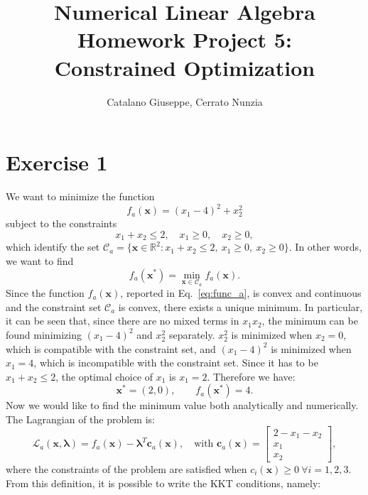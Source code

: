 \documentclass[a4paper,11pt]{article}
\newcommand{\R}{\mathbb{R}}
\begin{document}
	\author{Catalano Giuseppe, Cerrato Nunzia}
	\title{Numerical Linear Algebra Homework Project 5:\\Constrained Optimization}
	\date{}
	\maketitle

\section*{Exercise 1}
We want to minimize the function
\begin{equation}
	f_a(\textbf{x}) = (x_{1}-4)^2 + x_{2}^{2}
	\label{eq:func_a}
\end{equation}
subject to the constraints
\begin{equation}
	x_{1} + x_{2} \le 2, \quad x_{1} \ge 0, \quad x_{2} \ge 0,
	\label{eq:constr_a}
\end{equation}
which identify the set $\mathcal{C}_a = \{ \textbf{x} \in \R^2 : x_{1} + x_{2} \le 2, \ x_{1} \ge 0, \ x_{2} \ge 0 \}$. In other words, we want to find 
\begin{equation}
	f_a(\textbf{x}^*) = \min_{\textbf{x} \in \mathcal{C}_a} f_a(\textbf{x}).
\end{equation}
\noindent Since the function $f_a(\textbf{x})$, reported in Eq.~\eqref{eq:func_a}, is convex and continuous and the constraint set $\mathcal{C}_a$ is convex, there exists a unique minimum. In particular, it can be seen that, since there are no mixed terms in $x_1 x_2$, the minimum can be found minimizing $(x_{1}-4)^2$ and $x_{2}^{2}$ separately. $x_{2}^{2}$ is minimized when $x_{2} = 0$, which is compatible with the constraint set, and $(x_{1}-4)^2$ is minimized when $ x_{1} = 4$, which is incompatible with the constraint set. Since it has to be $x_{1} + x_{2} \le 2$, the optimal choice of $x_1$ is $x_1 = 2$. Therefore we have:
\begin{equation}
	\textbf{x}^* = (2,0),\qquad  f_a(\textbf{x}^*) = 4.
\end{equation}
\noindent Now we would like to find the minimum value both analytically and numerically.\\

\noindent The Lagrangian of the problem is:
\begin{equation}
	\mathcal{L}_a(\textbf{x},\boldsymbol{\lambda}) = f_a(\textbf{x}) - \boldsymbol{\lambda}^T \textbf{c}_a(\textbf{x}), \quad \text{with } \textbf{c}_a(\textbf{x}) = \begin{bmatrix}
		2 - x_1 - x_2\\
		x_1\\
		x_2
	\end{bmatrix},
\end{equation}
where the constraints of the problem are satisfied when $c_i(\textbf{x})\ge 0\ \forall i = 1,2,3$. From this definition, it is possible to write the KKT conditions, namely:
 
\end{document}
